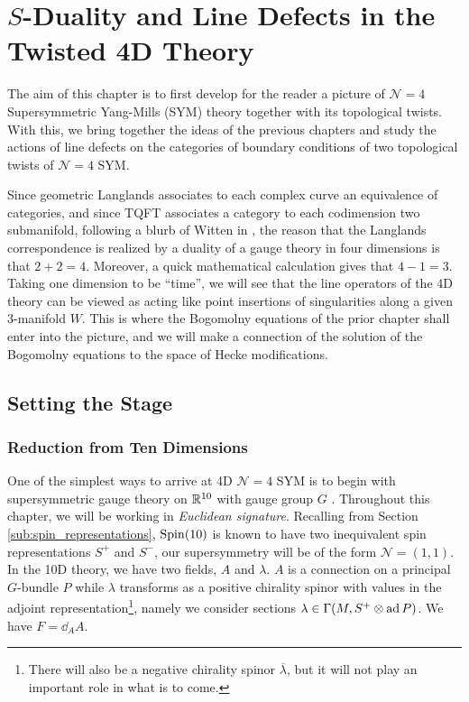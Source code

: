 \chapter{$S$-Duality and Line Defects in the Twisted 4D Theory\label{ch:finale}}

The aim of this chapter is to first develop for the reader a picture of $\mathcal N = 4$ Supersymmetric Yang-Mills (SYM) theory together with its topological twists. With this, we bring together the ideas of the previous chapters and study the actions of line defects on the categories of boundary conditions of two topological twists of $\mathcal N=4$ SYM.

	Since geometric Langlands associates to each complex curve an equivalence of categories, and since TQFT associates a category to each codimension two submanifold, following a blurb of Witten in \cite{witten2017}, the reason that the Langlands correspondence is realized by a duality of a gauge theory in four dimensions is that $2+2=4$. Moreover, a quick mathematical calculation gives that $4-1 = 3$. Taking one dimension to be ``time'', we will see that the line operators of the 4D theory can be viewed as acting like point insertions of singularities along a given 3-manifold $W$. This is where the Bogomolny equations of the prior chapter shall enter into the picture, and we will make a connection of the solution of the Bogomolny equations to the space of Hecke modifications.

\section{Setting the Stage} %
\label{sec:setting_the_stage}

\subsection{Reduction from Ten Dimensions} %
\label{sub:reduction_from_ten_dimensions}

One of the simplest ways to arrive at 4D $\mathcal N=4$ SYM is to begin with supersymmetric gauge theory on $\mathbb{R}^{10}$ with gauge group $G$ \cite{kapustin2006}. Throughout this chapter, we will be working in \emph{Euclidean signature}. Recalling from Section \ref{sub:spin_representations}, $\mathrm{Spin}(10)$ is known to have two inequivalent spin representations $S^+$ and $S^-$, our supersymmetry will be of the form $\mathcal N = (1, 1)$. In the 10D theory, we have two fields, $A$ and $\lambda$. $A$ is a connection on a principal $G$-bundle $P$ while $\lambda$ transforms as a positive chirality spinor with values in the adjoint representation\footnote{There will also be a negative chirality spinor $\overline \lambda$, but it will not play an important role in what is to come.}, namely we consider sections $\lambda \in \Gamma(M, S^+ \otimes \mathrm{ad}\, P)$. We have $F = \dd_{A} A$.

